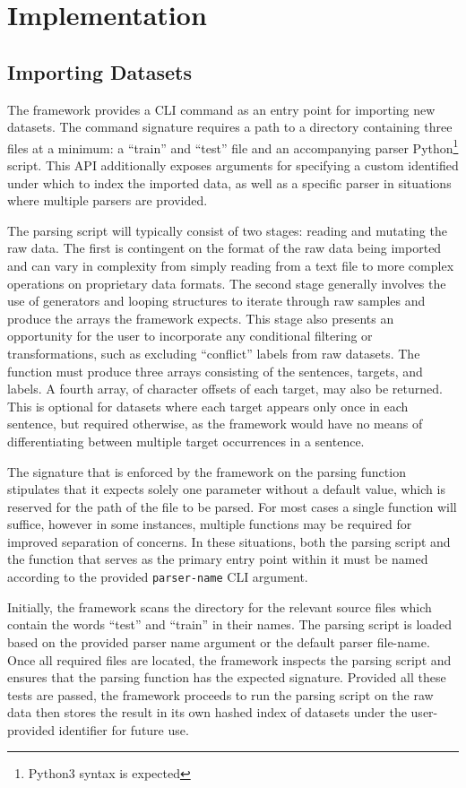 \documentclass[12pt, a4paper]{report}
\theoremstyle{definition}
\theoremstyle{definition}%
\theoremstyle{definition}%
\theoremstyle{definition}%
\theoremstyle{definition}%
\theoremstyle{definition}%
\begin{document}
\chapter{Implementation}
\section{Importing Datasets}
The framework provides a CLI command as an entry point for importing new datasets. The command signature requires a path to a directory containing three files at a minimum: a \enquote{train} and \enquote{test} file and an accompanying parser Python\footnote{Python3 syntax is expected} script. This API additionally exposes arguments for specifying a custom identified under which to index the imported data, as well as a specific parser in situations where multiple parsers are provided.

The parsing script will typically consist of two stages: reading and mutating the raw data. The first is contingent on the format of the raw data being imported and can vary in complexity from simply reading from a text file to more complex operations on proprietary data formats. The second stage generally involves the use of generators and looping structures to iterate through raw samples and produce the arrays the framework expects. This stage also presents an opportunity for the user to incorporate any conditional filtering or transformations, such as excluding \enquote{conflict} labels from raw datasets. The function must produce three arrays consisting of the sentences, targets, and labels. A fourth array, of character offsets of each target, may also be returned. This is optional for datasets where each target appears only once in each sentence, but required otherwise, as the framework would have no means of differentiating between multiple target occurrences in a sentence.

The signature that is enforced by the framework on the parsing function stipulates that it expects solely one parameter without a default value, which is reserved for the path of the file to be parsed. For most cases a single function will suffice, however in some instances, multiple functions may be required for improved  separation of concerns. In these situations, both the parsing script and the function that serves as the primary entry point within it must be named according to the provided \texttt{parser-name} CLI argument.

Initially, the framework scans the directory for the relevant source files which contain the words \enquote{test} and \enquote{train} in their names. The parsing script is loaded based on the provided parser name argument or the default parser file-name. Once all required files are located, the framework inspects the parsing script and ensures that the parsing function has the expected signature. Provided all these tests are passed, the framework proceeds to run the parsing script on the raw data then stores the result in its own hashed index of datasets under the user-provided identifier for future use.
\end{document}
